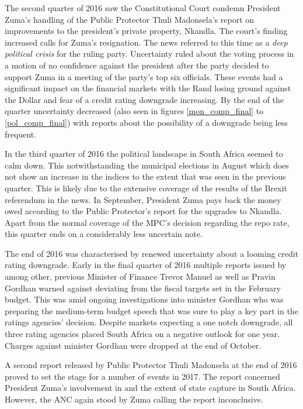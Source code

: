 \documentclass[11pt,preprint, authoryear]{elsarticle}
\numberwithin{equation}{section}
\numberwithin{figure}{section}
\numberwithin{table}{section}
\begin{document}
The second quarter of 2016 saw the Constitutional Court condemn
President Zuma's handling of the Public Protector Thuli Madonsela's
report on improvements to the president's private property, Nkandla. The
court's finding increased calls for Zuma's resignation. The news
referred to this time as a \emph{deep political crisis} for the ruling
party. Uncertainty ruled about the voting process in a motion of no
confidence against the president after the party decided to support Zuma
in a meeting of the party's top six officials. These events had a
significant impact on the financial markets with the Rand losing ground
against the Dollar and fear of a credit rating downgrade increasing. By
the end of the quarter uncertainty decreased (also seen in figures
\ref{mon_comp_final} to \ref{pol_comp_final}) with reports about the
possibility of a downgrade being less frequent.

In the third quarter of 2016 the political landscape in South Africa
seemed to calm down. This notwithstanding the municipal elections in
August which does not show an increase in the indices to the extent that
was seen in the previous quarter. This is likely due to the extensive
coverage of the results of the Brexit referendum in the news. In
September, President Zuma pays back the money owed according to the
Public Protector's report for the upgrades to Nkandla. Apart from the
normal coverage of the MPC's decision regarding the repo rate, this
quarter ends on a considerably less uncertain note.

The end of 2016 was characterised by renewed uncertainty about a looming
credit rating downgrade. Early in the final quarter of 2016 multiple
reports issued by among other, previous Minister of Finance Trevor
Manuel as well as Pravin Gordhan warned against deviating from the
fiscal targets set in the February budget. This was amid ongoing
investigations into minister Gordhan who was preparing the medium-term
budget speech that was sure to play a key part in the ratings agencies'
decision. Despite markets expecting a one notch downgrade, all three
rating agencies placed South Africa on a negative outlook for one year.
Charges against minister Gordhan were dropped at the end of October.

A second report released by Public Protector Thuli Madonsela at the end
of 2016 proved to set the stage for a number of events in 2017. The
report concerned President Zuma's involvement in and the extent of state
capture in South Africa. However, the ANC again stood by Zuma calling
the report inconclusive.
\end{document}
